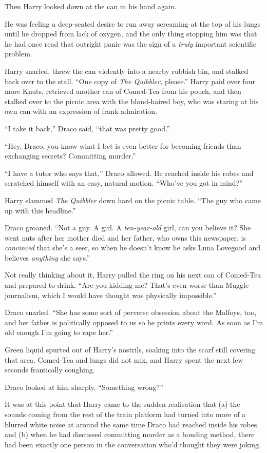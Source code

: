 Then Harry looked down at the can in his hand again.

He was feeling a deep-seated desire to run away screaming at the top of his lungs until he dropped from lack of oxygen, and the only thing stopping him was that he had once read that outright panic was the sign of a \emph{truly} important scientific problem.

Harry snarled, threw the can violently into a nearby rubbish bin, and stalked back over to the stall. ``One copy of \emph{The Quibbler,} please.'' Harry paid over four more Knuts, retrieved another can of Comed-Tea from his pouch, and then stalked over to the picnic area with the blond-haired boy, who was staring at his own can with an expression of frank admiration.

``I take it back,'' Draco said, ``that was pretty good.''

``Hey, Draco, you know what I bet is even better for becoming friends than exchanging secrets? Committing murder.''

``I have a tutor who says that,'' Draco allowed. He reached inside his robes and scratched himself with an easy, natural motion. ``Who've you got in mind?''

Harry slammed \emph{The Quibbler} down hard on the picnic table. ``The guy who came up with this headline.''

Draco groaned. ``Not a guy. A girl. A \emph{ten-year-old} girl, can you believe it? She went nuts after her mother died and her father, who owns this newspaper, is \emph{convinced} that she's a seer, so when he doesn't know he asks Luna Lovegood and believes \emph{anything} she says.''

Not really thinking about it, Harry pulled the ring on his next can of Comed-Tea and prepared to drink. ``Are you kidding me? That's even worse than Muggle journalism, which I would have thought was physically impossible.''

Draco snarled. ``She has some sort of perverse obsession about the Malfoys, too, and her father is politically opposed to us so he prints every word. As soon as I'm old enough I'm going to rape her.''

Green liquid spurted out of Harry's nostrils, soaking into the scarf still covering that area. Comed-Tea and lungs did not mix, and Harry spent the next few seconds frantically coughing.

Draco looked at him sharply. ``Something wrong?''

It was at this point that Harry came to the sudden realisation that (a) the sounds coming from the rest of the train platform had turned into more of a blurred white noise at around the same time Draco had reached inside his robes, and (b) when he had discussed committing murder as a bonding method, there had been exactly one person in the conversation who'd thought they were joking.

